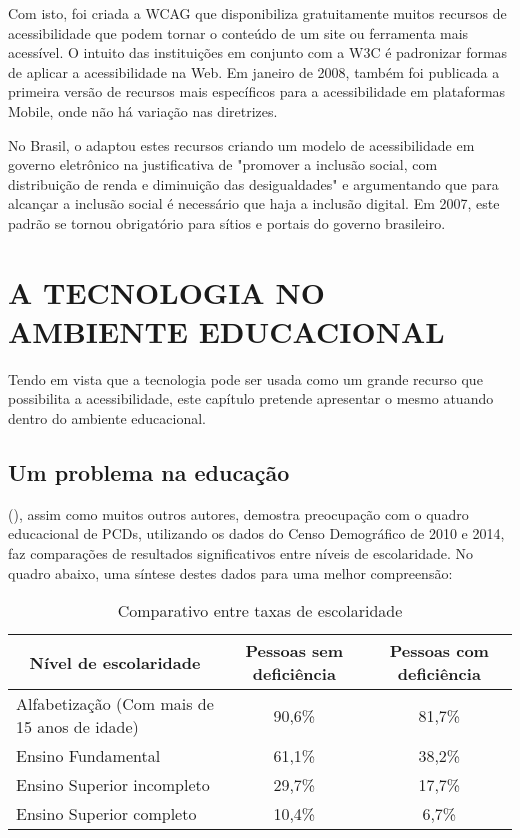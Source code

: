 Com isto, foi criada a WCAG que disponibiliza gratuitamente muitos recursos de acessibilidade que podem tornar o conteúdo de um site ou ferramenta mais acessível. O intuito das instituições em conjunto com a W3C é padronizar formas de aplicar a acessibilidade na Web. Em janeiro de 2008, também foi publicada a primeira versão de recursos mais específicos para a acessibilidade em plataformas Mobile, onde não há variação nas diretrizes.

No Brasil, o  adaptou estes recursos criando um modelo de acessibilidade em governo eletrônico na justificativa de "promover a inclusão social, com distribuição de renda e diminuição das desigualdades" e argumentando que para alcançar a inclusão social é necessário que haja a inclusão digital. Em 2007, este padrão se tornou obrigatório para sítios e portais do governo brasileiro. 


\chapter{A TECNOLOGIA NO AMBIENTE EDUCACIONAL}
\label{chap:fundamentacaoTeorica}

Tendo em vista que a tecnologia pode ser usada como um grande recurso que possibilita a acessibilidade, este capítulo pretende apresentar o mesmo atuando dentro do ambiente educacional.

\section{Um problema na educação}
\label{sec:}

(), assim como muitos outros autores, demostra preocupação com o quadro educacional de PCDs, utilizando os dados do Censo Demográfico de 2010 e 2014, faz comparações de resultados significativos entre níveis de escolaridade. No quadro abaixo, uma síntese destes dados para uma melhor compreensão:
 
\begin{table}[!ht]
\caption{Comparativo entre taxas de escolaridade}
\label{tableComparacao}
\begin{tabular}{|l|c|c|}
\hline
\multicolumn{1}{|c|}{Nível de escolaridade}  & Pessoas sem deficiência & Pessoas com deficiência \\ \hline
Alfabetização (Com mais de 15 anos de idade) & 90,6\%                  & 81,7\%                  \\ \hline
Ensino Fundamental                           & 61,1\%                  & 38,2\%                  \\ \hline
Ensino Superior incompleto                   & 29,7\%                  & 17,7\%                  \\ \hline
Ensino Superior completo                     & 10,4\%                  & 6,7\%                   \\ \hline
\end{tabular}
\end{table}

